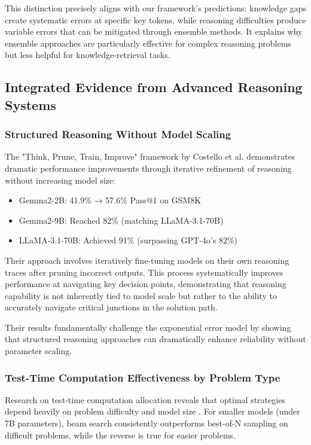 \documentclass{article}
\begin{document}
This distinction precisely aligns with our framework's predictions: knowledge gaps create systematic errors at specific key tokens, while reasoning difficulties produce variable errors that can be mitigated through ensemble methods. It explains why ensemble approaches are particularly effective for complex reasoning problems but less helpful for knowledge-retrieval tasks.

\subsection{Integrated Evidence from Advanced Reasoning Systems}

\subsubsection{Structured Reasoning Without Model Scaling}

The "Think, Prune, Train, Improve" framework by Costello et al. \citep{costello2025think} demonstrates dramatic performance improvements through iterative refinement of reasoning without increasing model size:

\begin{itemize}
\item Gemma2-2B: 41.9\% → 57.6\% Pass@1 on GSM8K
\item Gemma2-9B: Reached 82\% (matching LLaMA-3.1-70B)
\item LLaMA-3.1-70B: Achieved 91\% (surpassing GPT-4o's 82\%)
\end{itemize}

Their approach involves iteratively fine-tuning models on their own reasoning traces after pruning incorrect outputs. This process systematically improves performance at navigating key decision points, demonstrating that reasoning capability is not inherently tied to model scale but rather to the ability to accurately navigate critical junctions in the solution path.

Their results fundamentally challenge the exponential error model by showing that structured reasoning approaches can dramatically enhance reliability without parameter scaling.

\subsubsection{Test-Time Computation Effectiveness by Problem Type}

Research on test-time computation allocation reveals that optimal strategies depend heavily on problem difficulty and model size \citep{nvidia2023scaling, venture2025test}. For smaller models (under 7B parameters), beam search consistently outperforms best-of-N sampling on difficult problems, while the reverse is true for easier problems.
\end{document}
